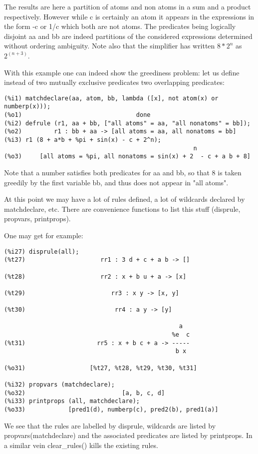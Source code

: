 \documentclass[a4paper,11pt]{article}
\begin{document}
The results are here a partition of atoms and non atoms in a sum and
a product respectively. However while c is certainly an atom it
appears in the expressions in the form -c or 1/c which both are not
atoms. The predicates being logically disjoint aa and bb are indeed
partitions of the considered expressions determined without ordering
ambiguity. Note also that the simplifier has written $8*2^n$ as $2^(n+3)$.

With this example one can indeed show the greediness problem:
let us define instead of two mutually exclusive predicates two
overlapping predicates:
\begin{verbatim}
(%i1) matchdeclare(aa, atom, bb, lambda ([x], not atom(x) or numberp(x)));
(%o1)                                done
(%i2) defrule (r1, aa + bb, ["all atoms" = aa, "all nonatoms" = bb]);
(%o2)         r1 : bb + aa -> [all atoms = aa, all nonatoms = bb]
(%i3) r1 (8 + a*b + %pi + sin(x) - c + 2^n);
                                                     n
(%o3)     [all atoms = %pi, all nonatoms = sin(x) + 2  - c + a b + 8]
\end{verbatim}
Note that a number satisfies both predicates for aa and bb, so that 8
is taken greedily by the first variable bb, and thus does not appear
in "all atoms".




At this point we may have a lot of rules defined, a lot of wildcards declared by
matchdeclare, etc. There are convenience functions to list this stuff (disprule,
propvars, printprops).

One may get for example:
\begin{verbatim}
(%i27) disprule(all);
(%t27)                     rr1 : 3 d + c + a b -> []

(%t28)                     rr2 : x + b u + a -> [x]

(%t29)                        rr3 : x y -> [x, y]

(%t30)                         rr4 : a y -> [y]

                                                 a
                                               %e  c
(%t31)                    rr5 : x + b c + a -> -----
                                                b x

(%o31)                  [%t27, %t28, %t29, %t30, %t31]

(%i32) propvars (matchdeclare);
(%o32)                           [a, b, c, d]
(%i33) printprops (all, matchdeclare);
(%o33)            [pred1(d), numberp(c), pred2(b), pred1(a)]
\end{verbatim}
We see that the rules are labelled by disprule, wildcards are listed by
propvars(matchdeclare) and the associated predicates are listed by printprops.
In a similar vein clear\_rules()  kills the existing rules.
\end{document}
